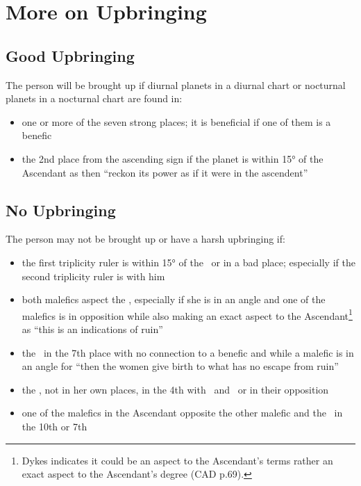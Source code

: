 \section{More on Upbringing}

\subsection{Good Upbringing}
\label{sec:upbringing2}
The person will be brought up if diurnal planets in a diurnal chart or nocturnal planets in a nocturnal chart are found in:
\begin{itemize}[topsep=0pt,itemsep=0pt]
\item one or more of the seven strong places; it is beneficial if one of them is a benefic

\item the 2nd place from the ascending sign if the planet is within 15° of the Ascendant as then ``reckon its power as if it were in the ascendent''
\end{itemize}

\subsection{No Upbringing}
The person may not be brought up or have a harsh upbringing if:
\begin{itemize}[topsep=0pt,itemsep=0pt]
\item the first triplicity ruler is within 15° of the \Sun\, or in a bad place; especially if the second triplicity ruler is with him

\item both malefics aspect the \Moon, especially if she is in an angle and one of the malefics is in opposition while also making an exact aspect to the Ascendant\footnote{Dykes indicates it could be an aspect to the Ascendant's terms rather an exact aspect to the Ascendant's degree (CAD p.69).} as ``this is an indications of ruin''

\item the \Moon\, in the 7th place with no connection to a benefic and while a malefic is in an angle for ``then the women give birth to what has no escape from ruin''

\item the \Moon, not in her own places, in the 4th with \Saturn\, and \Mars\, or in their opposition

\item one of the malefics in the Ascendant opposite the other malefic and the \Moon\, in the 10th or 7th

\end{itemize}

